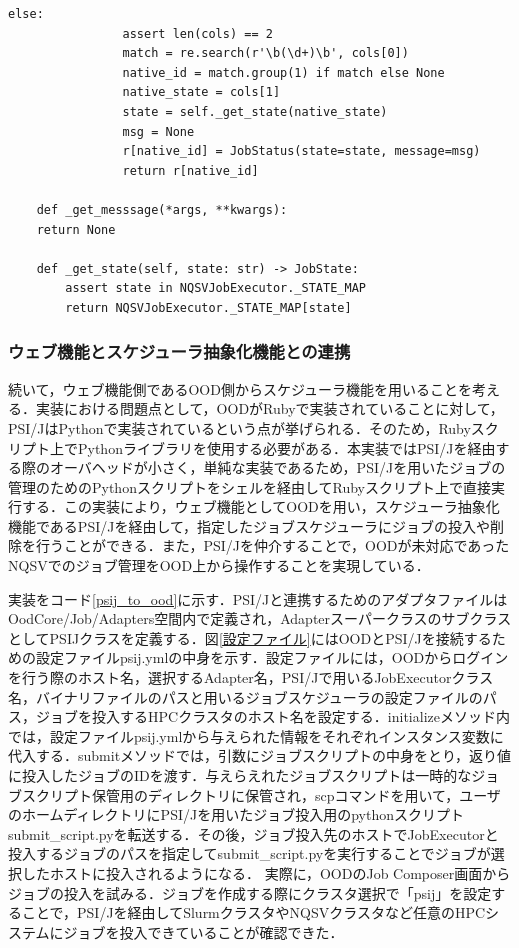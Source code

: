 \begin{lstlisting}[caption=ジョブの状態取得メソッド, label=get_status_now]
            else:
                assert len(cols) == 2
                match = re.search(r'\b(\d+)\b', cols[0])
                native_id = match.group(1) if match else None
                native_state = cols[1]
                state = self._get_state(native_state)
                msg = None
                r[native_id] = JobStatus(state=state, message=msg)
                return r[native_id]
    
    def _get_messsage(*args, **kwargs):  
    return None
    
    def _get_state(self, state: str) -> JobState: 
        assert state in NQSVJobExecutor._STATE_MAP
        return NQSVJobExecutor._STATE_MAP[state]
\end{lstlisting}


\subsubsection{ウェブ機能とスケジューラ抽象化機能との連携}
続いて，ウェブ機能側であるOOD側からスケジューラ機能を用いることを考える．実装における問題点として，OODがRubyで実装されていることに対して，PSI/JはPythonで実装されているという点が挙げられる\cite{cite9}\cite{cite10}．そのため，Rubyスクリプト上でPythonライブラリを使用する必要がある．本実装ではPSI/Jを経由する際のオーバヘッドが小さく，単純な実装であるため，PSI/Jを用いたジョブの管理のためのPythonスクリプトをシェルを経由してRubyスクリプト上で直接実行する．この実装により，ウェブ機能としてOODを用い，スケジューラ抽象化機能であるPSI/Jを経由して，指定したジョブスケジューラにジョブの投入や削除を行うことができる．また，PSI/Jを仲介することで，OODが未対応であったNQSVでのジョブ管理をOOD上から操作することを実現している．\par
実装をコード\ref{psij_to_ood}に示す．PSI/Jと連携するためのアダプタファイルはOodCore/Job/Adapters空間内で定義され，AdapterスーパークラスのサブクラスとしてPSIJクラスを定義する．図\ref{設定ファイル}にはOODとPSI/Jを接続するための設定ファイルpsij.ymlの中身を示す．設定ファイルには，OODからログインを行う際のホスト名，選択するAdapter名，PSI/Jで用いるJobExecutorクラス名，バイナリファイルのパスと用いるジョブスケジューラの設定ファイルのパス，ジョブを投入するHPCクラスタのホスト名を設定する．initializeメソッド内では，設定ファイルpsij.ymlから与えられた情報をそれぞれインスタンス変数に代入する．submitメソッドでは，引数にジョブスクリプトの中身をとり，返り値に投入したジョブのIDを渡す．与えらえれたジョブスクリプトは一時的なジョブスクリプト保管用のディレクトリに保管され，scpコマンドを用いて，ユーザのホームディレクトリにPSI/Jを用いたジョブ投入用のpythonスクリプトsubmit\_script.pyを転送する．その後，ジョブ投入先のホストでJobExecutorと投入するジョブのパスを指定してsubmit\_script.pyを実行することでジョブが選択したホストに投入されるようになる．
実際に，OODのJob Composer画面からジョブの投入を試みる．ジョブを作成する際にクラスタ選択で「psij」を設定することで，PSI/Jを経由してSlurmクラスタやNQSVクラスタなど任意のHPCシステムにジョブを投入できていることが確認できた．\par


